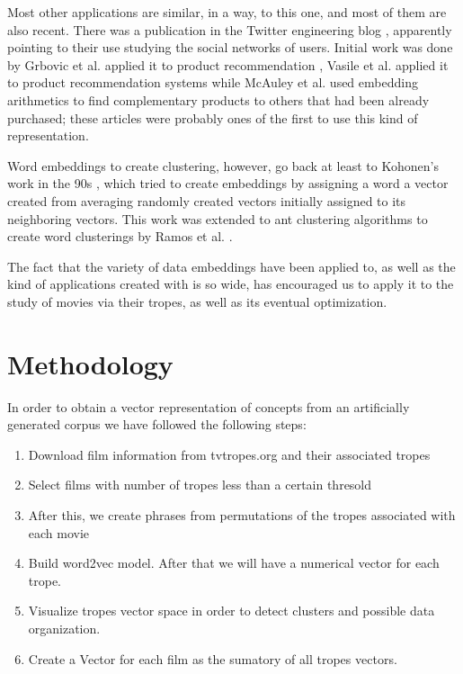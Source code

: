 \documentclass[letterpaper]{article}
\begin{document}
	Most other applications are similar, in a way, to this one,
	and most of them are also recent. There was a publication in
	the Twitter engineering blog \cite{twitter:embeddings},
	apparently pointing to their use studying the social networks
	of users. Initial work was done by Grbovic et al. applied it to product recommendation
	\cite{Grbovic2015}, Vasile et al. applied it to product
	recommendation systems \cite{vasile2016} while McAuley et
	al. \cite{DBLP:journals/corr/McAuleyPL15} used embedding
	arithmetics to find complementary products to others that had
	been already purchased; these articles were
	probably ones of the first to use this kind of
	representation.
	
	Word embeddings to create clustering, however, go back at
	least to Kohonen's work in the 90s
	\cite{kohonen1997exploration}, which tried to create
	embeddings by assigning a word a vector created from averaging
	randomly created vectors initially assigned to its neighboring
	vectors. This work was extended to ant clustering algorithms
	to create word clusterings by Ramos et
	al. \cite{DBLP:journals/corr/abs-cs-0412075}.
	
	The fact that the variety of data embeddings have been applied
	to, as well as the kind of applications created with is so
	wide, has encouraged us to apply it to the study of movies via
	their tropes, as well as its eventual optimization.
	
	\section{Methodology}
	\label{sec:met}
	
	In order to obtain a vector representation of concepts from an artificially generated corpus we have followed the following steps:
	
	\begin{enumerate}
		\item Download film information from tvtropes.org and their associated tropes
		\item Select films with number of tropes less than a certain thresold
		\item After this, we create phrases from permutations of the tropes associated with each movie
		\item Build word2vec model. After that we will have a numerical vector for each trope.\\
		\item Visualize tropes vector space in order to detect clusters and possible data organization. \item Create a Vector for each film as the sumatory of all tropes vectors. \\

    \end{enumerate}
\end{document}
